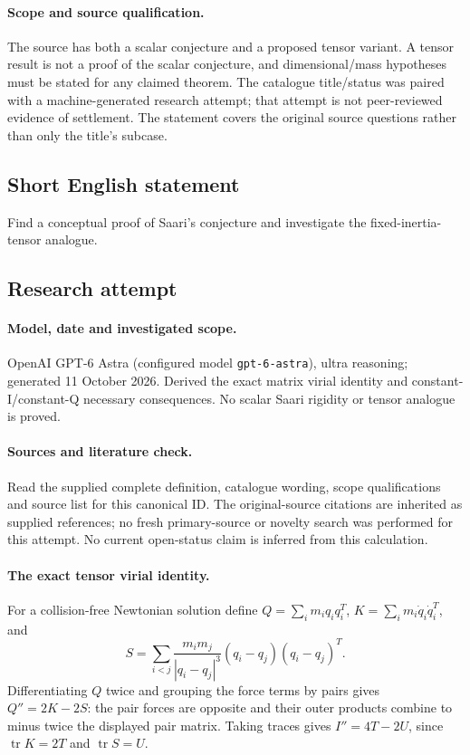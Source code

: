 \documentclass[11pt]{article}
\begin{document}
\paragraph{Scope and source qualification.}The source has both a scalar conjecture and a proposed tensor variant. A tensor result is not a proof of the scalar conjecture, and dimensional/mass hypotheses must be stated for any claimed theorem. The catalogue title/status was paired with a machine-generated research attempt; that attempt is not peer-reviewed evidence of settlement. The statement covers the original source questions rather than only the title’s subcase.
\subsection{Short English statement}
Find a conceptual proof of Saari’s conjecture and investigate the fixed-inertia-tensor analogue.
\subsection{Research attempt}
\paragraph{Model, date and investigated scope.}
OpenAI GPT-6 Astra (configured model \texttt{gpt-6-astra}), ultra reasoning; generated 11 October 2026. Derived the exact matrix virial identity and constant-I/constant-Q necessary consequences. No scalar Saari rigidity or tensor analogue is proved.

\paragraph{Sources and literature check.}
Read the supplied complete definition, catalogue wording, scope qualifications and source list for this canonical ID. The original-source citations are inherited as supplied references; no fresh primary-source or novelty search was performed for this attempt. No current open-status claim is inferred from this calculation.

\paragraph{The exact tensor virial identity.}For a collision-free Newtonian solution define \(Q=\sum_im_iq_iq_i^T\), \(K=\sum_im_i\dot q_i\dot q_i^T\), and
\[S=\sum_{i<j}\frac{m_im_j}{|q_i-q_j|^3}(q_i-q_j)(q_i-q_j)^T.
\]
Differentiating \(Q\) twice and grouping the force terms by pairs gives \(Q''=2K-2S\): the pair forces are opposite and their outer products combine to minus twice the displayed pair matrix. Taking traces gives \(I''=4T-2U\), since \(\operatorname{tr}K=2T\) and \(\operatorname{tr}S=U\).
\end{document}
